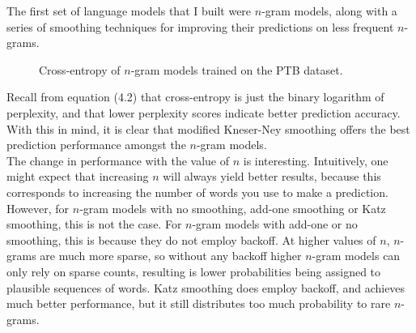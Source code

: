 \documentclass[a4paper, 12pt]{report}
\begin{document}
The first set of language models that I built were $n$-gram models, along with a series of smoothing techniques for improving their predictions on less frequent $n$-grams.


\begin{figure}[h]
\caption{Cross-entropy of $n$-gram models trained on the PTB dataset.}
\end{figure}

Recall from equation (4.2) that cross-entropy is just the binary logarithm of perplexity, and that lower perplexity scores indicate better prediction accuracy. With this in mind, it is clear that modified Kneser-Ney smoothing offers the best prediction performance amongst the $n$-gram models. \\

The change in performance with the value of $n$ is interesting. Intuitively, one might expect that increasing $n$ will always yield better results, because this corresponds to increasing the number of words you use to make a prediction. However, for $n$-gram models with no smoothing, add-one smoothing or Katz smoothing, this is not the case. For $n$-gram models with add-one or no smoothing, this is because they do not employ backoff. At higher values of $n$, $n$-grams are much more sparse, so without any backoff higher $n$-gram models can only rely on sparse counts, resulting is lower probabilities being assigned to plausible sequences of words. Katz smoothing does employ backoff, and achieves much better performance, but it still distributes too much probability to rare $n$-grams.
\end{document}
